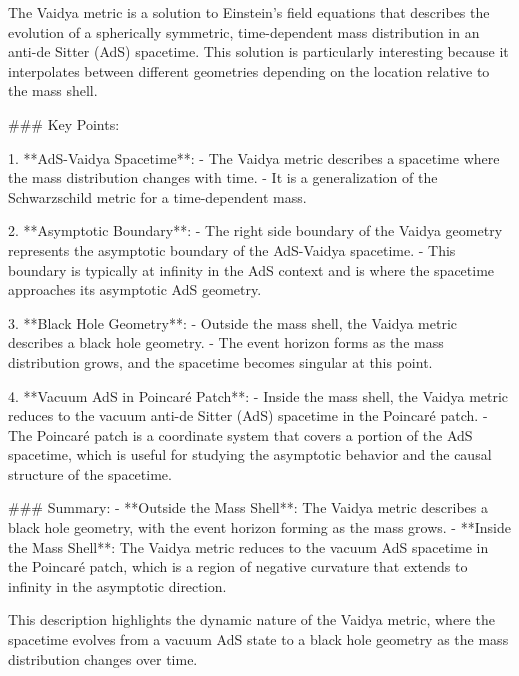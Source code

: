 The Vaidya metric is a solution to Einstein's field equations that describes the evolution of a spherically symmetric, time-dependent mass distribution in an anti-de Sitter (AdS) spacetime. This solution is particularly interesting because it interpolates between different geometries depending on the location relative to the mass shell.

### Key Points:

1. **AdS-Vaidya Spacetime**:
   - The Vaidya metric describes a spacetime where the mass distribution changes with time.
   - It is a generalization of the Schwarzschild metric for a time-dependent mass.

2. **Asymptotic Boundary**:
   - The right side boundary of the Vaidya geometry represents the asymptotic boundary of the AdS-Vaidya spacetime.
   - This boundary is typically at infinity in the AdS context and is where the spacetime approaches its asymptotic AdS geometry.

3. **Black Hole Geometry**:
   - Outside the mass shell, the Vaidya metric describes a black hole geometry.
   - The event horizon forms as the mass distribution grows, and the spacetime becomes singular at this point.

4. **Vacuum AdS in Poincaré Patch**:
   - Inside the mass shell, the Vaidya metric reduces to the vacuum anti-de Sitter (AdS) spacetime in the Poincaré patch.
   - The Poincaré patch is a coordinate system that covers a portion of the AdS spacetime, which is useful for studying the asymptotic behavior and the causal structure of the spacetime.

### Summary:
- **Outside the Mass Shell**: The Vaidya metric describes a black hole geometry, with the event horizon forming as the mass grows.
- **Inside the Mass Shell**: The Vaidya metric reduces to the vacuum AdS spacetime in the Poincaré patch, which is a region of negative curvature that extends to infinity in the asymptotic direction.

This description highlights the dynamic nature of the Vaidya metric, where the spacetime evolves from a vacuum AdS state to a black hole geometry as the mass distribution changes over time.